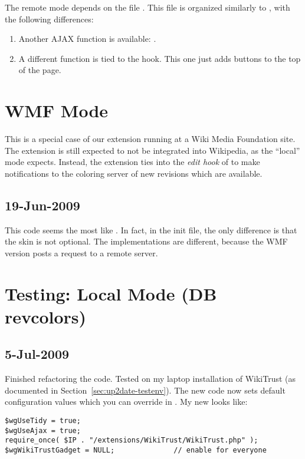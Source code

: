 The remote mode depends on the file .
This file is organized similarly to ,
with the following differences:
\begin{enumerate}
\item Another AJAX function is available: .
\item A different function is tied to the  hook.  This one just adds buttons to the top of the page.
\end{enumerate}

\section{WMF Mode}

This is a special case of our extension running at a Wiki Media Foundation site.
The extension is still expected to not be integrated into Wikipedia,
as the ``local'' mode expects.
Instead, the extension ties into the \textit{edit hook} of
 to make notifications to the coloring server
of new revisions which are available.

\subsection{19-Jun-2009}

This code seems the most like .
In fact, in the init file, the only difference is that the skin is not optional.
The implementations are different, because the WMF version posts
a request to a remote server.

\section{Testing: Local Mode (DB revcolors)}

\subsection{5-Jul-2009}

Finished refactoring the code.
Tested on my laptop installation of WikiTrust (as documented
in Section~\ref{sec:up2date-testenv}).
The new code now sets default configuration values which
you can override in .
My new  looks like:
\begin{verbatim}
$wgUseTidy = true;
$wgUseAjax = true;
require_once( $IP . "/extensions/WikiTrust/WikiTrust.php" );
$wgWikiTrustGadget = NULL;              // enable for everyone
\end{verbatim}

